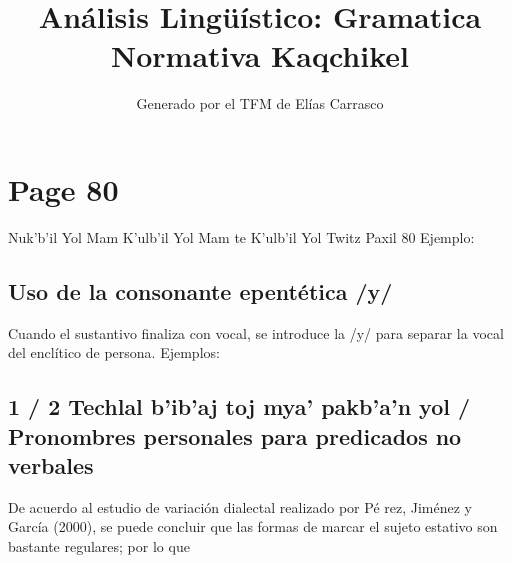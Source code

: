 \documentclass{article}%
\title{Análisis Lingüístico: Gramatica Normativa Kaqchikel}%
\author{Generado por el TFM de Elías Carrasco}%
\begin{document}
%
\normalsize%
\maketitle%
\section{Page 80}%
\label{sec:Page80}%
Nuk’b’il Yol Mam %
K’ulb’il Yol Mam te K’ulb’il Yol Twitz Paxil 80 %
Ejemplo: %
\subsection{Uso de la consonante epentética /y/}%
\label{subsec:Usodelaconsonanteepenttica/y/}%

%
Cuando el sustantivo finaliza con vocal, se introduce la /y/ para %
separar la vocal del enclítico de persona. %
Ejemplos: %
\subsection{1 / 2 Techlal b’ib’aj toj mya’ pakb’a’n yol / Pronombres personales para predicados no verbales}%
\label{subsec:1/2Techlalbibajtojmyapakbanyol/Pronombrespersonalesparapredicadosnoverbales}%

%
De acuerdo al estudio de variación dialectal realizado por Pé rez, Jiménez y García (2000), se puede concluir que las formas de marcar el sujeto estativo son bastante regulares; por lo que 

%
\end{document}
